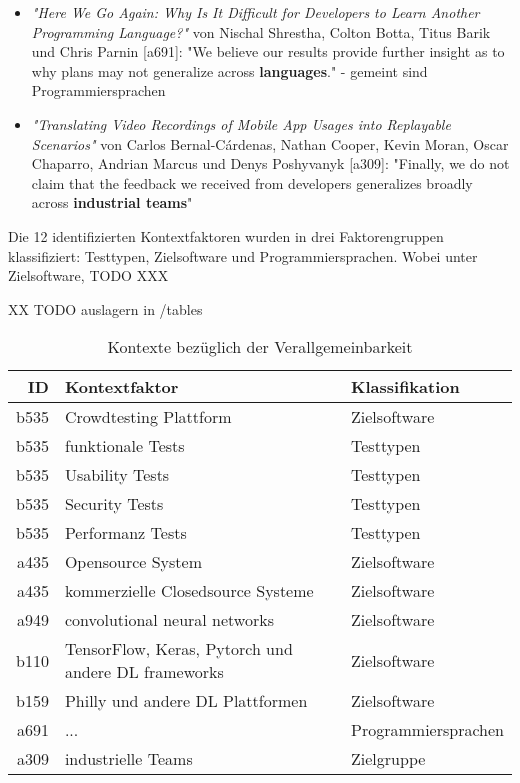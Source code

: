 \begin{itemize}
    \item \textit{"Here We Go Again: Why Is It Difficult for Developers to Learn Another Programming Language?"} von Nischal Shrestha, Colton Botta, Titus Barik und Chris Parnin [a691]: "We believe our results provide further insight as to why plans may not generalize across \textbf{languages}." - gemeint sind Programmiersprachen 
    \item \textit{"Translating Video Recordings of Mobile App Usages into Replayable Scenarios"} von Carlos Bernal-Cárdenas, Nathan Cooper, Kevin Moran, Oscar Chaparro, Andrian Marcus und Denys Poshyvanyk [a309]: "Finally, we do not claim that the feedback we received from developers generalizes broadly across \textbf{industrial teams}"
\end{itemize}

Die 12 identifizierten Kontextfaktoren wurden in drei Faktorengruppen klassifiziert: Testtypen, Zielsoftware und Programmiersprachen. Wobei unter Zielsoftware, TODO XXX

XX TODO auslagern in /tables \\
\begin{table}[h!]
\begin{tabular}{ r | l | l  }
 ID & Kontextfaktor & Klassifikation \\ 
   \hline
 b535 & Crowdtesting Plattform & Zielsoftware\\
 b535 & funktionale Tests & Testtypen \\
 b535 & Usability Tests & Testtypen \\
 b535 & Security Tests & Testtypen \\
 b535 & Performanz Tests & Testtypen \\
 a435 & Opensource System & Zielsoftware \\
 a435 & kommerzielle Closedsource Systeme & Zielsoftware \\
 a949 & convolutional neural networks & Zielsoftware  \\
 b110 & TensorFlow, Keras, Pytorch und andere DL frameworks & Zielsoftware  \\
 b159 & Philly und andere DL Plattformen & Zielsoftware \\
 a691 & ... & Programmiersprachen \\
 a309 & industrielle Teams & Zielgruppe  \\
\end{tabular}
\caption{Kontexte bezüglich der Verallgemeinbarkeit}
\label{table:kontexte-verallgemeinbarkeit}
\end{table}

